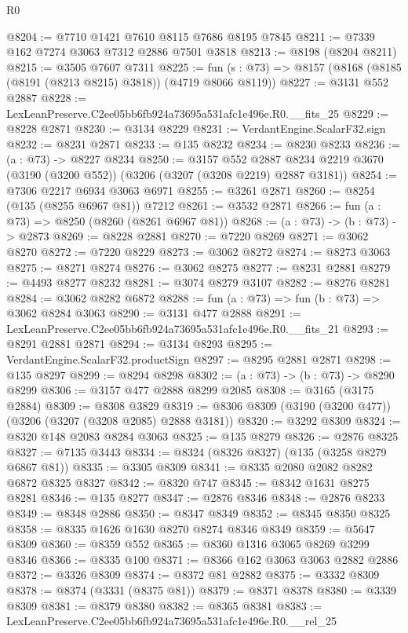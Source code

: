 \begin{lexlean}{R0}
\begin{coremodule}
@8204 := @7710 @1421 @7610 @8115 @7686 @8195 @7845
@8211 := @7339 @162 @7274 @3063 @7312 @2886 @7501 @3818
@8213 := @8198 (@8204 @8211)
@8215 := @3505 @7607 @7311
@8225 := fun (s : @73) => @8157 (@8168 (@8185 (@8191 (@8213 @8215) @3818)) (@4719 @8066 @8119))
@8227 := @3131 @552 @2887
@8228 := LexLeanPreserve.C2ee05bb6fb924a73695a531afc1e496e.R0.__fits_25
@8229 := @8228 @2871
@8230 := @3134 @8229
@8231 := VerdantEngine.ScalarF32.sign
@8232 := @8231 @2871
@8233 := @135 @8232
@8234 := @8230 @8233
@8236 := (a : @73) -> @8227 @8234
@8250 := @3157
    @552
    @2887
    @8234
    @2219
    @3670
    (@3190 (@3200 @552))
    (@3206 (@3207 (@3208 @2219) @2887 @3181))
@8254 := @7306 @2217 @6934 @3063 @6971
@8255 := @3261 @2871
@8260 := @8254 (@135 (@8255 @6967 @81)) @7212
@8261 := @3532 @2871
@8266 := fun (a : @73) => @8250 (@8260 (@8261 @6967 @81))
@8268 := (a : @73) -> (b : @73) -> @2873
@8269 := @8228 @2881
@8270 := @7220 @8269
@8271 := @3062 @8270
@8272 := @7220 @8229
@8273 := @3062 @8272
@8274 := @8273 @3063
@8275 := @8271 @8274
@8276 := @3062 @8275
@8277 := @8231 @2881
@8279 := @4493 @8277 @8232
@8281 := @3074 @8279 @3107
@8282 := @8276 @8281
@8284 := @3062 @8282 @6872
@8288 := fun (a : @73) => fun (b : @73) => @3062 @8284 @3063
@8290 := @3131 @477 @2888
@8291 := LexLeanPreserve.C2ee05bb6fb924a73695a531afc1e496e.R0.__fits_21
@8293 := @8291 @2881 @2871
@8294 := @3134 @8293
@8295 := VerdantEngine.ScalarF32.productSign
@8297 := @8295 @2881 @2871
@8298 := @135 @8297
@8299 := @8294 @8298
@8302 := (a : @73) -> (b : @73) -> @8290 @8299
@8306 := @3157 @477 @2888 @8299 @2085
@8308 := @3165 (@3175 @2884)
@8309 := @8308 @3829
@8319 := @8306 @8309 (@3190 (@3200 @477)) (@3206 (@3207 (@3208 @2085) @2888 @3181))
@8320 := @3292 @8309
@8324 := @8320 @148 @2083 @8284 @3063
@8325 := @135 @8279
@8326 := @2876 @8325
@8327 := @7135 @3443
@8334 := @8324 (@8326 @8327) (@135 (@3258 @8279 @6867 @81))
@8335 := @3305 @8309
@8341 := @8335 @2080 @2082 @8282 @6872 @8325 @8327
@8342 := @8320 @747
@8345 := @8342 @1631 @8275 @8281
@8346 := @135 @8277
@8347 := @2876 @8346
@8348 := @2876 @8233
@8349 := @8348 @2886
@8350 := @8347 @8349
@8352 := @8345 @8350 @8325
@8358 := @8335 @1626 @1630 @8270 @8274 @8346 @8349
@8359 := @5647 @8309
@8360 := @8359 @552
@8365 := @8360 @1316 @3065 @8269 @3299 @8346
@8366 := @8335 @100
@8371 := @8366 @162 @3063 @3063 @2882 @2886
@8372 := @3326 @8309
@8374 := @8372 @81 @2882
@8375 := @3332 @8309
@8378 := @8374 (@3331 (@8375 @81))
@8379 := @8371 @8378
@8380 := @3339 @8309
@8381 := @8379 @8380
@8382 := @8365 @8381
@8383 := LexLeanPreserve.C2ee05bb6fb924a73695a531afc1e496e.R0.__rel_25

\end{coremodule}
\end{lexlean}
